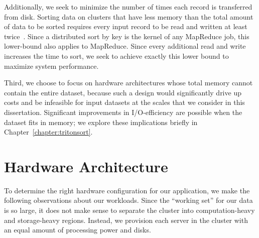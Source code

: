 Additionally, we seek to minimize the number of times each record is
transferred from disk.  Sorting data on clusters that have less memory than the
total amount of data to be sorted requires every input record to be read and
written at least twice~\cite{sort-io}.  Since a distributed sort by key is the
kernel of any MapReduce job, this lower-bound also applies to MapReduce. Since
every additional read and write increases the time to sort, we seek to achieve
exactly this lower bound to maximize system performance.

Third, we choose to focus on hardware architectures whose total memory cannot
contain the entire dataset, because such a design would significantly drive up
costs and be infeasible for input datasets at the scales that we consider in
this dissertation. Significant improvements in I/O-efficiency are possible when
the dataset fits in memory; we explore these implications briefly in
Chapter~\ref{chapter:tritonsort}.

\section{Hardware Architecture}

To determine the right hardware configuration for our application, we make the
following observations about our workloads. Since the ``working set'' for our
data is so large, it does not make sense to separate the cluster into
computation-heavy and storage-heavy regions. Instead, we provision each server
in the cluster with an equal amount of processing power and disks.

